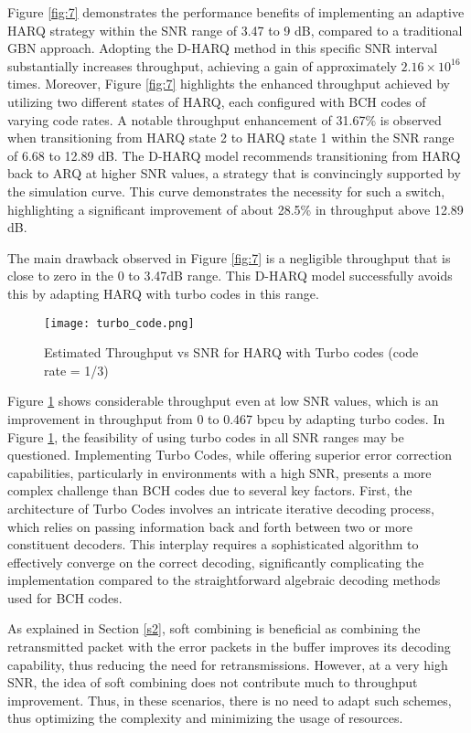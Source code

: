 \documentclass[sn-mathphys-num]{sn-jnl}
\theoremstyle{thmstyleone}
\theoremstyle{thmstyletwo}%
\theoremstyle{thmstylethree}%
\begin{document}
Figure \ref{fig:7} demonstrates the performance benefits of implementing an adaptive HARQ strategy within the SNR range of 3.47 to 9 dB, compared to a traditional GBN approach. Adopting the D-HARQ method in this specific SNR interval substantially increases throughput, achieving a gain of approximately $2.16\times 10^{16}$ times. Moreover, Figure \ref{fig:7} highlights the enhanced throughput achieved by utilizing two different states of HARQ, each configured with BCH codes of varying code rates. A notable throughput enhancement of 31.67\% is observed when transitioning from HARQ state 2 to HARQ state 1 within the SNR range of 6.68 to 12.89 dB. The D-HARQ model recommends transitioning from HARQ back to ARQ at higher SNR values, a strategy that is convincingly supported by the simulation curve. This curve demonstrates the necessity for such a switch, highlighting a significant improvement of about 28.5\% in throughput above 12.89 dB.

The main drawback observed in Figure \ref{fig:7} is a negligible throughput that is close to zero in the 0 to 3.47dB range. This D-HARQ model successfully avoids this by adapting HARQ with turbo codes in this range.

\begin{figure}[H]
    \centering
    \texttt{[image: turbo\_code.png]}
    \caption{Estimated Throughput vs SNR for HARQ with Turbo codes (code rate = 1/3)}
    \label{fig:6}
\end{figure}

Figure \ref{fig:6} shows considerable throughput even at low SNR values, which is an improvement in throughput from 0 to 0.467 bpcu by adapting turbo codes. In Figure \ref{fig:6}, the feasibility of using turbo codes in all SNR ranges may be questioned. Implementing Turbo Codes, while offering superior error correction capabilities, particularly in environments with a high SNR, presents a more complex challenge than BCH codes due to several key factors. First, the architecture of Turbo Codes involves an intricate iterative decoding process, which relies on passing information back and forth between two or more constituent decoders. This interplay requires a sophisticated algorithm to effectively converge on the correct decoding, significantly complicating the implementation compared to the straightforward algebraic decoding methods used for BCH codes.

As explained in Section \ref{s2}, soft combining is beneficial as combining the retransmitted packet with the error packets in the buffer improves its decoding capability, thus reducing the need for retransmissions. However, at a very high SNR, the idea of soft combining does not contribute much to throughput improvement. Thus, in these scenarios, there is no need to adapt such schemes, thus optimizing the complexity and minimizing the usage of resources.
\end{document}
